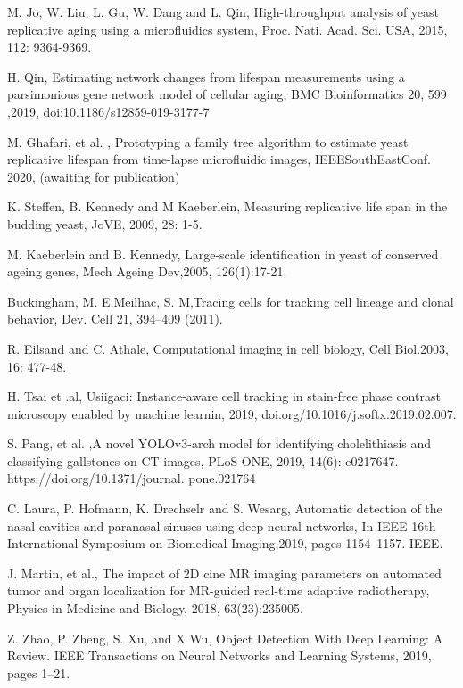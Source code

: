 \documentclass[conference]{IEEEtran}
\begin{document}
\begin{thebibliography}{00}
M. Jo, W. Liu, L. Gu, W. Dang and  L. Qin, High-throughput analysis of yeast replicative aging using a microfluidics system, Proc. Nati. Acad. Sci. USA, 2015, 112: 9364-9369.


H. Qin, Estimating network changes from lifespan measurements using a parsimonious gene network model of cellular aging, BMC Bioinformatics 20, 599 ,2019, doi:10.1186/s12859-019-3177-7


M. Ghafari,  et al. , Prototyping a family tree algorithm to estimate yeast replicative lifespan from time-lapse microfluidic images, IEEESouthEastConf. 2020, (awaiting for publication)



K. Steffen, B. Kennedy and M Kaeberlein, Measuring replicative life span in the budding yeast, JoVE, 2009,  28: 1-5.

M. Kaeberlein and B. Kennedy, Large-scale identification in yeast of conserved ageing genes, Mech Ageing Dev,2005, 126(1):17-21.

Buckingham, M. E,Meilhac, S. M,Tracing cells for tracking cell lineage and clonal behavior, Dev. Cell 21, 394–409 (2011).

R. Eilsand and C. Athale, Computational imaging in cell biology, Cell Biol.2003, 16: 477-48.

H. Tsai et .al, Usiigaci: Instance-aware cell tracking in stain-free phase contrast microscopy enabled by machine learnin, 2019, doi.org/10.1016/j.softx.2019.02.007.

S. Pang,  et al. ,A novel YOLOv3-arch model for identifying cholelithiasis and classifying gallstones on CT images, PLoS ONE, 2019, 14(6): e0217647. https://doi.org/10.1371/journal. pone.021764

C.  Laura, P. Hofmann, K. Drechselr  and S. Wesarg, Automatic detection of the nasal cavities and paranasal sinuses using deep neural networks, In IEEE 16th International Symposium on Biomedical Imaging,2019, pages 1154–1157. IEEE.

J. Martin, et al., The impact of 2D cine MR imaging parameters on automated tumor and organ localization for MR-guided real-time adaptive radiotherapy, Physics in Medicine and Biology, 2018, 63(23):235005.

Z. Zhao, P. Zheng, S. Xu, and X Wu, Object Detection With Deep Learning: A Review. IEEE Transactions on Neural Networks and Learning Systems, 2019, pages 1–21.


\end{thebibliography}
\end{document}
